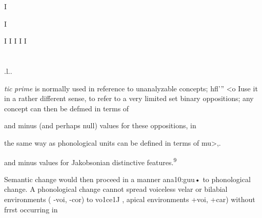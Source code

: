 I 

I

I I I I I

\section{}
.l..

\textit{tic} \textit{prime} is normally used in reference to unanalyzable concepts; hfl'{\textquotedbl}'' {\textless}o Iuse it in a rather different sense, to refer to a very limited set binary oppositions; any concept can then be defmed in terms of

and minus (and perhaps null) values for these oppositions, in

the same way as phonological units can be defined in terms of mu{\textgreater},.

and minus values for Jakobsonian distinctive features.\textsuperscript{9}

Semantic change would then proceed in a manner ana10:guu• to phonological change. A phonological change cannot spread voiceless velar or bilabial environments ( {}-voi, {}-cor) to vo1ce1J , apical environments +voi, +car) without frrst occurring in


